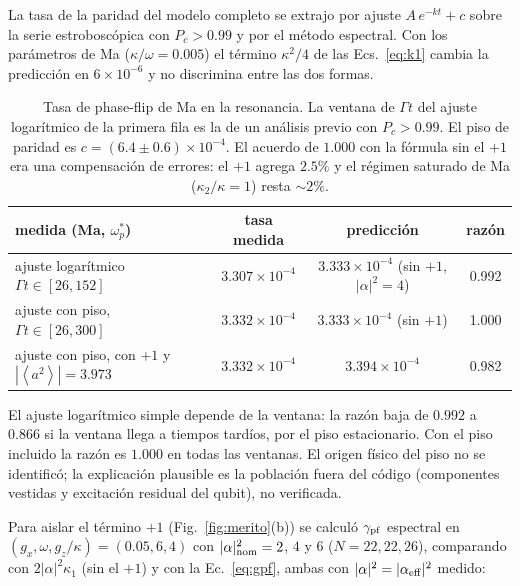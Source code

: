 \documentclass[11pt,a4paper]{article}
\newcommand{\ave}[1]{\left\langle#1\right\rangle}
\newcommand{\wps}{\omega_p^{*}}
\theoremstyle{definition}
\begin{document}
La tasa de la paridad del modelo completo se extrajo por ajuste $A\,e^{-kt}+c$ sobre la serie estroboscópica con $P_c>0.99$ y por el método espectral. Con los parámetros de Ma ($\kappa/\omega=0.005$) el término $\kappa^2/4$ de las Ecs.~\eqref{eq:k1} cambia la predicción en $6\times10^{-6}$ y no discrimina entre las dos formas.

\begin{table}[h]
\centering
\begin{tabular}{lccc}
\toprule
medida (Ma, $\wps$) & tasa medida & predicción & razón\\
\midrule
ajuste logarítmico $\Gamma t\in[26,152]$ & $3.307\times10^{-4}$ & $3.333\times10^{-4}$ (sin $+1$, $|\alpha|^2=4$) & 0.992\\
ajuste con piso, $\Gamma t\in[26,300]$ & $3.332\times10^{-4}$ & $3.333\times10^{-4}$ (sin $+1$) & 1.000\\
ajuste con piso, con $+1$ y $|\ave{a^2}|=3.973$ & $3.332\times10^{-4}$ & $3.394\times10^{-4}$ & 0.982\\
\bottomrule
\end{tabular}
\caption{Tasa de phase-flip de Ma en la resonancia. La ventana de $\Gamma t$ del ajuste logarítmico de la primera fila es la de un análisis previo con $P_c>0.99$. El piso de paridad es $c=(6.4\pm0.6)\times10^{-4}$. El acuerdo de $1.000$ con la fórmula sin el $+1$ era una compensación de errores: el $+1$ agrega $2.5\%$ y el régimen saturado de Ma ($\kappa_2/\kappa=1$) resta $\sim2\%$.}
\label{tab:V3}
\end{table}

El ajuste logarítmico simple depende de la ventana: la razón baja de $0.992$ a $0.866$ si la ventana llega a tiempos tardíos, por el piso estacionario. Con el piso incluido la razón es $1.000$ en todas las ventanas. El origen físico del piso no se identificó; la explicación plausible es la población fuera del código (componentes vestidas y excitación residual del qubit), no verificada.

Para aislar el término $+1$ (Fig.~\ref{fig:merito}(b)) se calculó $\gamma_{\rm pf}$ espectral en $(g_x,\omega,g_z/\kappa)=(0.05,6,4)$ con $|\alpha|^2_{\rm nom}=2$, $4$ y $6$ ($N=22,22,26$), comparando con $2|\alpha|^2\kappa_1$ (sin el $+1$) y con la Ec.~\eqref{eq:gpf}, ambas con $|\alpha|^2=|\alpha_{\rm eff}|^2$ medido:
\end{document}
